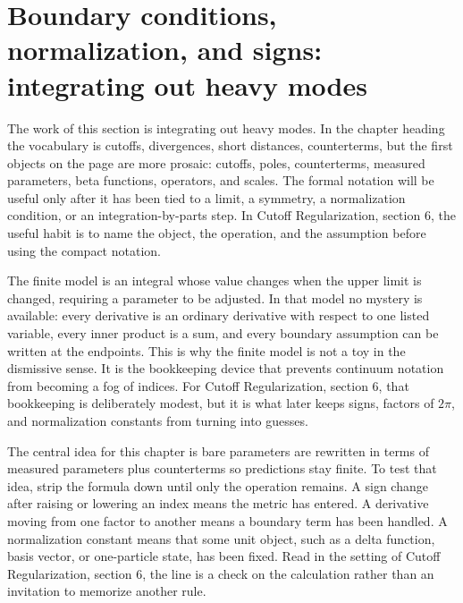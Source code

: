 \section{Boundary conditions, normalization, and signs: integrating out heavy modes}













The work of this section is integrating out heavy modes.  In the chapter heading the vocabulary is cutoffs, divergences, short distances, counterterms, but the first objects on the page are more prosaic: cutoffs, poles, counterterms, measured parameters, beta functions, operators, and scales.  The formal notation will be useful only after it has been tied to a limit, a symmetry, a normalization condition, or an integration-by-parts step.  In Cutoff Regularization, section 6, the useful habit is to name the object, the operation, and the assumption before using the compact notation.

The finite model is an integral whose value changes when the upper limit is changed, requiring a parameter to be adjusted.  In that model no mystery is available: every derivative is an ordinary derivative with respect to one listed variable, every inner product is a sum, and every boundary assumption can be written at the endpoints.  This is why the finite model is not a toy in the dismissive sense.  It is the bookkeeping device that prevents continuum notation from becoming a fog of indices.  For Cutoff Regularization, section 6, that bookkeeping is deliberately modest, but it is what later keeps signs, factors of \(2\pi\), and normalization constants from turning into guesses.

The central idea for this chapter is bare parameters are rewritten in terms of measured parameters plus counterterms so predictions stay finite.  To test that idea, strip the formula down until only the operation remains.  A sign change after raising or lowering an index means the metric has entered.  A derivative moving from one factor to another means a boundary term has been handled.  A normalization constant means that some unit object, such as a delta function, basis vector, or one-particle state, has been fixed.  Read in the setting of Cutoff Regularization, section 6, the line is a check on the calculation rather than an invitation to memorize another rule.

